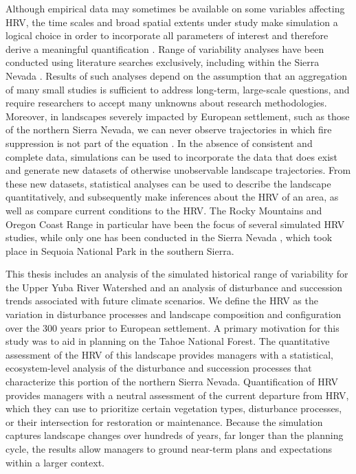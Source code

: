 Although empirical data may sometimes be available on some variables affecting HRV, the time scales and broad spatial extents under study make simulation a logical choice in order to incorporate all parameters of interest and therefore derive a meaningful quantification \citep{Swetnam1999,Mladenoff1999}. Range of variability analyses have been conducted using literature searches exclusively, including within the Sierra Nevada \citep{Safford2013}. Results of such analyses depend on the assumption that an aggregation of many small studies is sufficient to address long-term, large-scale questions, and require researchers to accept many unknowns about research methodologies. Moreover, in landscapes severely impacted by European settlement, such as those of the northern Sierra Nevada, we can never observe trajectories in which fire suppression is not part of the equation \citep{Keane2012}. In the absence of consistent and complete data, simulations can be used to incorporate the data that does exist and generate new datasets of otherwise unobservable landscape trajectories. From these new datasets, statistical analyses can be used to describe the landscape quantitatively, and subsequently make inferences about the HRV of an area, as well as compare current conditions to the HRV. The Rocky Mountains and Oregon Coast Range in particular have been the focus of several simulated HRV studies, while only one has been conducted in the Sierra Nevada \citep{Miller1999}, which took place in Sequoia National Park in the southern Sierra. 

This thesis includes an analysis of the simulated historical range of variability for the Upper Yuba River Watershed and an analysis of disturbance and succession trends associated with future climate scenarios. We define the HRV as the variation in disturbance processes and landscape composition and configuration over the 300 years prior to European settlement. A primary motivation for this study was to aid in planning on the Tahoe National Forest. The quantitative assessment of the HRV of this landscape provides managers with a statistical, ecosystem-level analysis of the disturbance and succession processes that characterize this portion of the northern Sierra Nevada. Quantification of HRV provides managers with a neutral assessment of the current departure from HRV, which they can use to prioritize certain vegetation types, disturbance processes, or their intersection for restoration or maintenance. Because the simulation captures landscape changes over hundreds of years, far longer than the planning cycle, the results allow managers to ground near-term plans and expectations within a larger context. 

